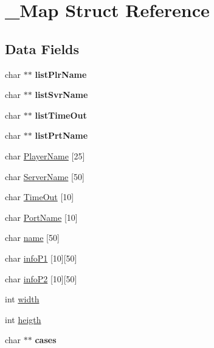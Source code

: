\hypertarget{struct___map}{}\section{\+\_\+\+Map Struct Reference}
\label{struct___map}
\subsection*{Data Fields}
\begin{DoxyCompactItemize}
\item 
char $\ast$$\ast$ {\bfseries list\+Plr\+Name}\hypertarget{struct___map_ade5703e4636c30db184056e412bbad9f}{}\label{struct___map_ade5703e4636c30db184056e412bbad9f}

\item 
char $\ast$$\ast$ {\bfseries list\+Svr\+Name}\hypertarget{struct___map_a8cf857386077284b154dda055543b3b8}{}\label{struct___map_a8cf857386077284b154dda055543b3b8}

\item 
char $\ast$$\ast$ {\bfseries list\+Time\+Out}\hypertarget{struct___map_a2fd94d11f33e862deebb3b7d667ba636}{}\label{struct___map_a2fd94d11f33e862deebb3b7d667ba636}

\item 
char $\ast$$\ast$ {\bfseries list\+Prt\+Name}\hypertarget{struct___map_a45b86bccc4b981236f1c4a63f08ae81e}{}\label{struct___map_a45b86bccc4b981236f1c4a63f08ae81e}

\item 
char \hyperlink{struct___map_a612b2a0ee041233958a9ef2896741004}{Player\+Name} \mbox{[}25\mbox{]}
\item 
char \hyperlink{struct___map_a8688ed54a60069cc4615ee29c9c6c552}{Server\+Name} \mbox{[}50\mbox{]}
\item 
char \hyperlink{struct___map_ab1aeb27b976555390e2429e283a877b7}{Time\+Out} \mbox{[}10\mbox{]}
\item 
char \hyperlink{struct___map_a92a954e5ff7b84046e76bd7c9a54138b}{Port\+Name} \mbox{[}10\mbox{]}
\item 
char \hyperlink{struct___map_ae5cb967283dbbdf75cb2032c1fa08fee}{name} \mbox{[}50\mbox{]}
\item 
char \hyperlink{struct___map_abd5a12f6d08d1da5d84e9142bcef5d9a}{info\+P1} \mbox{[}10\mbox{]}\mbox{[}50\mbox{]}
\item 
char \hyperlink{struct___map_a7918e7b9cb5d1890b8b6f01464a40e25}{info\+P2} \mbox{[}10\mbox{]}\mbox{[}50\mbox{]}
\item 
int \hyperlink{struct___map_a2474a5474cbff19523a51eb1de01cda4}{width}
\item 
int \hyperlink{struct___map_ae951a64b5603fdb0385b729946d1ebe1}{heigth}
\item 
char $\ast$$\ast$ {\bfseries cases}\hypertarget{struct___map_a601e32b61d466f9df86e0fbc527472bf}{}\label{struct___map_a601e32b61d466f9df86e0fbc527472bf}


\end{DoxyCompactItemize}

